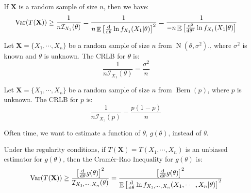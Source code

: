 \documentclass{huhtakm-template-book-v2}
\DeclareMathOperator{\E}{\mathbb{E}}
\DeclareMathOperator{\Var}{Var}
\DeclareMathOperator{\Bern}{Bern}
\DeclareMathOperator{\N}{N}
\begin{document}
\newpage
\begin{rem}
	If $\mathbf{X}$ is a random sample of size $n$, then we have:
	\begin{equation*}
		\Var(T(\mathbf{X}))\geq\frac{1}{n\mathcal{I}_{X_{1}}(\theta)}=\frac{1}{n\E\left[\odv*{\ln{f_{X_{1}}(X_{1}|\theta)}}{\theta}\right]^{2}}=\frac{1}{-n\E\left[\odv*[order={2}]{\ln{f_{X_{1}}(X_{1}|\theta)}}{\theta}\right]}
	\end{equation*}
\end{rem}
\begin{eg}
	Let $\mathbf{X}=\{X_{1},\cdots,X_{n}\}$ be a random sample of size $n$ from $\N(\theta,\sigma^{2})$., where $\sigma^{2}$ is known and $\theta$ is unknown. The CRLB for $\theta$ is:
	\begin{equation*}
		\frac{1}{n\mathcal{I}_{X_{1}}(\theta)}=\frac{\sigma^{2}}{n}
	\end{equation*}
\end{eg}
\begin{eg}
	Let $\mathbf{X}=\{X_{1},\cdots,X_{n}\}$ be a random sample of size $n$ from $\Bern(p)$, where $p$ is unknown. The CRLB for $p$ is:
	\begin{equation*}
		\frac{1}{n\mathcal{I}_{X_{1}}(p)}=\frac{p(1-p)}{n}
	\end{equation*}
\end{eg}
Often time, we want to estimate a function of $\theta$, $g(\theta)$, instead of $\theta$.
\begin{thm}
	Under the regularity conditions, if $T(\mathbf{X})=T(X_{1},\cdots,X_{n})$ is an unbiased estimator for $g(\theta)$, then the Cram\'er-Rao Inequality for $g(\theta)$ is:
	\begin{equation*}
		\Var(T(\mathbf{X}))\geq\frac{\left[\odv*{g(\theta)}{\theta}\right]^{2}}{\mathcal{I}_{X_{1},\cdots,X_{n}}(\theta)}=\frac{\left[\odv*{g(\theta)}{\theta}\right]^{2}}{\E\left[\odv*{\ln{f_{X_{1},\cdots,X_{n}}(X_{1},\cdots,X_{n}|\theta)}}{\theta}\right]^{2}}
	\end{equation*}
\end{thm}
\end{document}
